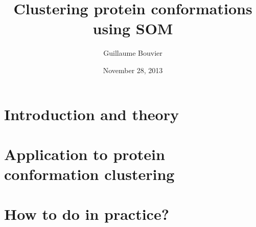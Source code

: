 \documentclass[]{beamer}
\title{Clustering protein conformations using SOM}
\author{Guillaume Bouvier}
\date{November 28, 2013}
\begin{document}
\frame{\titlepage}
\section{Introduction and theory}













\section{Application to protein conformation clustering}



\section{How to do in practice?}

\end{document}
